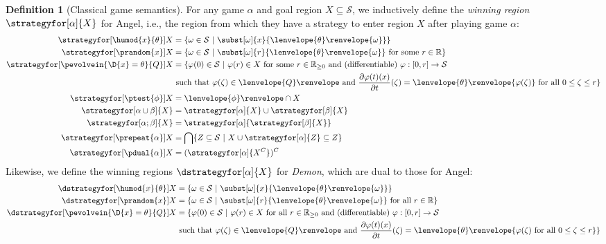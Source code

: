 \documentclass[12pt]{cmuthesis}
\theoremstyle{definition}
\newtheorem{definition}{Definition}
\theoremstyle{remark}
\newcommand{\ivr}{Q}
\newcommand{\allstate}{\mathcal{S}}
\newcommand{\om}{\omega}
\newcommand{\tint}[2]{\lenvelope{#1}\renvelope{#2}}
\newcommand{\fint}[1]{\lenvelope{#1}\renvelope}
\begin{document}
\begin{definition}[Classical game semantics]\label{def:dgl-sem-game}
For any game $\alpha$ and goal region $X \subseteq \allstate$, we inductively define the \emph{winning region} $\strategyfor[\alpha]{X}$ for Angel, i.e., the region from which they have a strategy to enter region $X$ after playing game $\alpha$:
\begin{align*}
\strategyfor[\humod{x}{\theta}]{X} &= \{ \om \in \allstate~|~\subst[\om]{x}{\tint{\theta}{\om}}\} \\
\strategyfor[\prandom{x}]{X}       &= \{ \om \in \allstate~|~\subst[\om]{r}{\tint{\theta}{\om}}\text{ for some }r \in \mathbb{R}\} \\
\strategyfor[\pevolvein{\D{x}=\theta}{\ivr}]{X} &= \{\varphi(0) \in \allstate~|~\varphi(r) \in X\text{ for some }r \in \mathbb{R}_{\geq0}\text{ and (differentiable) }\varphi:[0,r]\to \allstate\\
&\text{ such that }\varphi(\zeta) \in \fint{\ivr}\text{ and } \frac{\partial \varphi(t)(x)}{\partial t}(\zeta) = \tint{\theta}{\varphi(\zeta)}\text{ for all }0 \leq \zeta \leq r \}\\
\strategyfor[\ptest{\phi}]{X}      &= \fint{\phi} \cap X \\
\strategyfor[\alpha \cup \beta]{X} &= \strategyfor[\alpha]{X} \cup \strategyfor[\beta]{X}\\
\strategyfor[\alpha;\beta]{X}      &= \strategyfor[\alpha]{\strategyfor[\beta]{X}}\\
\strategyfor[\prepeat{\alpha}]{X}  &= \bigcap\{Z \subseteq \allstate~|~ X \cup \strategyfor[\alpha]{Z} \subseteq Z\}\\
\strategyfor[\pdual{\alpha}]{X}    &= (\strategyfor[\alpha]{X^C})^C
\end{align*}
Likewise, we define the winning regions $\dstrategyfor[\alpha]{X}$ for \emph{Demon}, which are dual to those for Angel:
\begin{align*}
\dstrategyfor[\humod{x}{\theta}]{X} &= \{ \om \in \allstate~|~\subst[\om]{x}{\tint{\theta}{\om}}\}\\
\dstrategyfor[\prandom{x}]{X}       &= \{ \om \in \allstate~|~\subst[\om]{r}{\tint{\theta}{\om}}\text{ for all }r \in \mathbb{R}\} \\
\dstrategyfor[\pevolvein{\D{x}=\theta}{\ivr}]{X} &= \{\varphi(0) \in \allstate~|~\varphi(r) \in X\text{ for all }r \in \mathbb{R}_{\geq0}\text{ and (differentiable) }\varphi:[0,r]\to\allstate\\
&\text{ such that }\varphi(\zeta) \in \fint{\ivr}\text{ and }\frac{\partial\varphi(t)(x)}{\partial t}(\zeta) = \tint{\theta}{\varphi(\zeta)\text{ for all }0 \leq \zeta \leq r}\}\\

\end{align*}
\end{definition}
\end{document}
